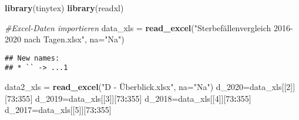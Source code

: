 \documentclass[
]{article}
\newenvironment{Shaded}{\begin{snugshade}}{\end{snugshade}}
\newcommand{\CommentTok}[1]{\textcolor[rgb]{0.56,0.35,0.01}{\textit{#1}}}
\newcommand{\DataTypeTok}[1]{\textcolor[rgb]{0.13,0.29,0.53}{#1}}
\newcommand{\DecValTok}[1]{\textcolor[rgb]{0.00,0.00,0.81}{#1}}
\newcommand{\KeywordTok}[1]{\textcolor[rgb]{0.13,0.29,0.53}{\textbf{#1}}}
\newcommand{\NormalTok}[1]{#1}
\newcommand{\OperatorTok}[1]{\textcolor[rgb]{0.81,0.36,0.00}{\textbf{#1}}}
\newcommand{\StringTok}[1]{\textcolor[rgb]{0.31,0.60,0.02}{#1}}
\begin{document}
\begin{Shaded}
\begin{Highlighting}[]
\KeywordTok{library}\NormalTok{(tinytex)}
\KeywordTok{library}\NormalTok{(readxl)}

\CommentTok{#Excel-Daten importieren}
\NormalTok{data_xls =}\StringTok{ }\KeywordTok{read_excel}\NormalTok{(}\StringTok{"Sterbefällenvergleich 2016-2020 nach Tagen.xlsx"}\NormalTok{, }\DataTypeTok{na=}\StringTok{"Na"}\NormalTok{)}
\end{Highlighting}
\end{Shaded}

\begin{verbatim}
## New names:
## * `` -> ...1
\end{verbatim}

\begin{Shaded}
\begin{Highlighting}[]
\NormalTok{data2_xls =}\StringTok{ }\KeywordTok{read_excel}\NormalTok{(}\StringTok{"D - Überblick.xlsx"}\NormalTok{, }\DataTypeTok{na=}\StringTok{"Na"}\NormalTok{)}
\NormalTok{d_}\DecValTok{2020}\NormalTok{=data_xls[[}\DecValTok{2}\NormalTok{]][}\DecValTok{73}\OperatorTok{:}\DecValTok{355}\NormalTok{]}
\NormalTok{d_}\DecValTok{2019}\NormalTok{=data_xls[[}\DecValTok{3}\NormalTok{]][}\DecValTok{73}\OperatorTok{:}\DecValTok{355}\NormalTok{]}
\NormalTok{d_}\DecValTok{2018}\NormalTok{=data_xls[[}\DecValTok{4}\NormalTok{]][}\DecValTok{73}\OperatorTok{:}\DecValTok{355}\NormalTok{]}
\NormalTok{d_}\DecValTok{2017}\NormalTok{=data_xls[[}\DecValTok{5}\NormalTok{]][}\DecValTok{73}\OperatorTok{:}\DecValTok{355}\NormalTok{]}



\end{Highlighting}
\end{Shaded}
\end{document}
